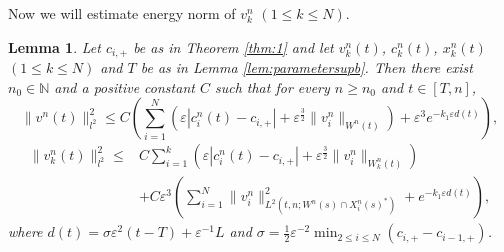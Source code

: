 \documentclass[11pt]{amsart}
\newtheorem{lemma}[theorem]{Lemma}
\theoremstyle{remark}
\numberwithin{equation}{section}
\begin{document}
Now we will estimate energy norm of $v_k^n$ $(1\le k\le N)$.
\begin{lemma}
  \label{lem:speed-Hamiltonian}
Let $c_{i,+}$ be as in Theorem \ref{thm:1} and let $v_k^n(t)$, $c_k^n(t)$,
$x_k^n(t)$ $(1\le k\le N)$ and $T$ be as in Lemma \ref{lem:parametersupb}.
Then there exist $n_0\in{\mathbb{N}}$ and a positive constant $C$ such that for
every $n\ge n_0$ and $t\in[T,n]$,
\begin{equation}
  \label{eq:enorm}
\|v^n(t)\|_{l^2}^2\le C\left(\sum_{i=1}^N({\varepsilon}|c_i^n(t)-c_{i,+}|+
{\varepsilon}^{\frac32}\|v_i^n\|_{W^n(t)})+{\varepsilon}^3e^{-k_1{\varepsilon} d(t)}\right),
\end{equation}
\begin{equation}
  \label{eq:locenorm}
  \begin{split}
\|v_k^n(t)\|_{l^2}^2 \le & C\sum_{i=1}^k\left(
{\varepsilon}|c_i^n(t)-c_{i,+}|+{\varepsilon}^{\frac32}\|v_i^n\|_{W_k^n(t)}\right)
\\ & +C{\varepsilon}^3\left(\sum_{i=1}^N\|v_i^n\|_{L^2(t,n;W^n(s)\cap X_i^n(s)^*)}^2
+e^{-k_1{\varepsilon} d(t)}\right),
  \end{split}
\end{equation}
where $d(t)=\sigma{\varepsilon}^2(t-T)+{\varepsilon}^{-1}L$ and
$\sigma=\frac12{\varepsilon}^{-2}\min_{2\le i\le N}(c_{i,+}-c_{i-1,+})$.
\end{lemma}
\end{document}
